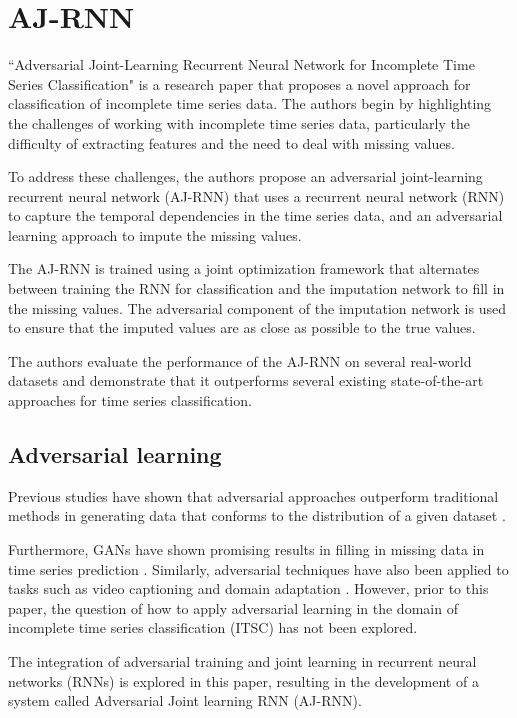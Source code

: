 \section{AJ-RNN}
``Adversarial Joint-Learning Recurrent Neural Network for Incomplete Time Series Classification" \cite{ajrnn} is a research paper that proposes a novel approach for classification of incomplete time series data.
The authors begin by highlighting the challenges of working with incomplete time series data, particularly the difficulty of extracting features and the need to deal with missing values.

To address these challenges, the authors propose an adversarial joint-learning recurrent neural network (AJ-RNN) that uses a recurrent neural network (RNN) to capture the temporal dependencies in the time series data, and an adversarial learning approach to impute the missing values.

The AJ-RNN is trained using a joint optimization framework that alternates between training the RNN for classification and the imputation network to fill in the missing values.
The adversarial component of the imputation network is used to ensure that the imputed values are as close as possible to the true values.

The authors evaluate the performance of the AJ-RNN on several real-world datasets and demonstrate that it outperforms several existing state-of-the-art approaches for time series classification.

\subsection{Adversarial learning}

Previous studies have shown that adversarial approaches outperform traditional methods in generating data that conforms to the distribution of a given dataset \cite{goodfellow2014generative, ledig2017photo}.

Furthermore, GANs have shown promising results in filling in missing data in time series prediction \cite{yoon2018gain, li2018learning, luo2018multivariate}. Similarly, adversarial techniques have also been applied to tasks such as video captioning \cite{yang2018video} and domain adaptation \cite{ganin2017domain}.
However, prior to this paper, the question of how to apply adversarial learning in the domain of incomplete time series classification (ITSC) has not been explored.

The integration of adversarial training and joint learning in recurrent neural networks (RNNs) is explored in this paper, resulting in the development of a system called Adversarial Joint learning RNN (AJ-RNN).


